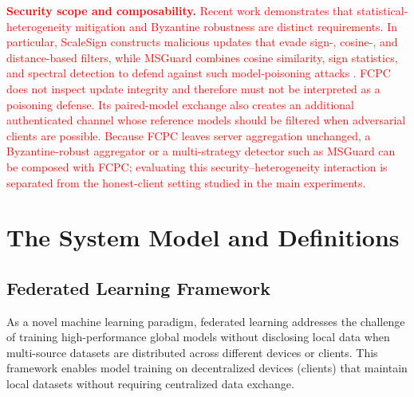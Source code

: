 \documentclass[journal,twoside,web]{ieeecolor}
\newcommand{\rev}[1]{\textcolor{red}{#1}}
\begin{document}
\rev{\textbf{Security scope and composability. }Recent work demonstrates that statistical-heterogeneity mitigation and Byzantine robustness are distinct requirements. In particular, ScaleSign constructs malicious updates that evade sign-, cosine-, and distance-based filters, while MSGuard combines cosine similarity, sign statistics, and spectral detection to defend against such model-poisoning attacks \cite{yang2025scalesign}. FCPC does not inspect update integrity and therefore must not be interpreted as a poisoning defense. Its paired-model exchange also creates an additional authenticated channel whose reference models should be filtered when adversarial clients are possible. Because FCPC leaves server aggregation unchanged, a Byzantine-robust aggregator or a multi-strategy detector such as MSGuard can be composed with FCPC; evaluating this security--heterogeneity interaction is separated from the honest-client setting studied in the main experiments.}








\section{The System Model and Definitions}
\subsection{Federated Learning Framework}

As a novel machine learning paradigm, federated learning addresses the challenge of training high-performance global models without disclosing local data when multi-source datasets are distributed across different devices or clients. This framework enables model training on decentralized devices (clients) that maintain local datasets without requiring centralized data exchange.
\end{document}
